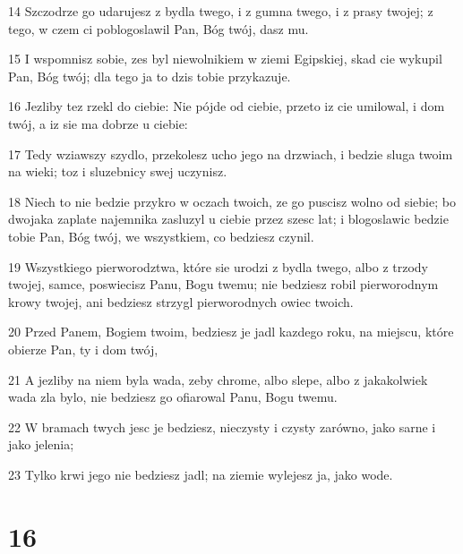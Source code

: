 \par 14 Szczodrze go udarujesz z bydla twego, i z gumna twego, i z prasy twojej; z tego, w czem ci poblogoslawil Pan, Bóg twój, dasz mu.
\par 15 I wspomnisz sobie, zes byl niewolnikiem w ziemi Egipskiej, skad cie wykupil Pan, Bóg twój; dla tego ja to dzis tobie przykazuje.
\par 16 Jezliby tez rzekl do ciebie: Nie pójde od ciebie, przeto iz cie umilowal, i dom twój, a iz sie ma dobrze u ciebie:
\par 17 Tedy wziawszy szydlo, przekolesz ucho jego na drzwiach, i bedzie sluga twoim na wieki; toz i sluzebnicy swej uczynisz.
\par 18 Niech to nie bedzie przykro w oczach twoich, ze go puscisz wolno od siebie; bo dwojaka zaplate najemnika zasluzyl u ciebie przez szesc lat; i blogoslawic bedzie tobie Pan, Bóg twój, we wszystkiem, co bedziesz czynil.
\par 19 Wszystkiego pierworodztwa, które sie urodzi z bydla twego, albo z trzody twojej, samce, poswiecisz Panu, Bogu twemu; nie bedziesz robil pierworodnym krowy twojej, ani bedziesz strzygl pierworodnych owiec twoich.
\par 20 Przed Panem, Bogiem twoim, bedziesz je jadl kazdego roku, na miejscu, które obierze Pan, ty i dom twój,
\par 21 A jezliby na niem byla wada, zeby chrome, albo slepe, albo z jakakolwiek wada zla bylo, nie bedziesz go ofiarowal Panu, Bogu twemu.
\par 22 W bramach twych jesc je bedziesz, nieczysty i czysty zarówno, jako sarne i jako jelenia;
\par 23 Tylko krwi jego nie bedziesz jadl; na ziemie wylejesz ja, jako wode.

\chapter{16}

